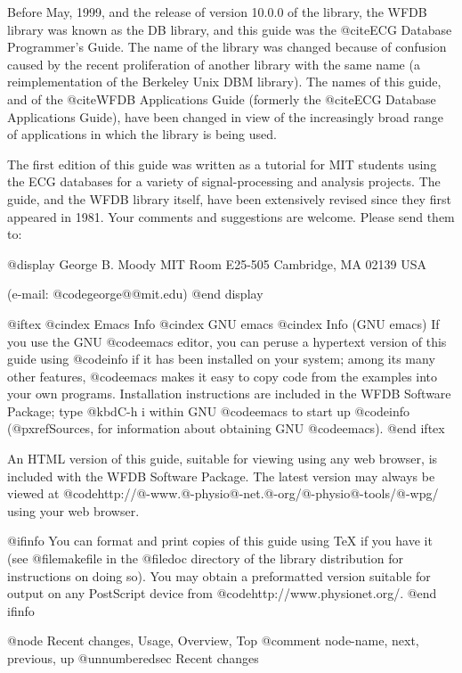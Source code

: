 Before May, 1999, and the release of version 10.0.0 of the library, the
WFDB library was known as the DB library, and this guide was the @cite{ECG
Database Programmer's Guide}.  The name of the library was changed because
of confusion caused by the recent proliferation of another library with
the same name (a reimplementation of the Berkeley Unix DBM library).
The names of this guide, and of the @cite{WFDB Applications Guide} (formerly
the @cite{ECG Database Applications Guide}), have been changed in view of
the increasingly broad range of applications in which the library is being
used.

The first edition of this guide was written as a tutorial for MIT
students using the ECG databases for a variety of signal-processing and
analysis projects.  The guide, and the WFDB library itself, have been
extensively revised since they first appeared in 1981.  Your comments
and suggestions are welcome.  Please send them to:

@display
George B. Moody
MIT Room E25-505
Cambridge, MA 02139
USA

(e-mail: @code{george@@mit.edu})
@end display

@iftex
@cindex Emacs Info
@cindex GNU emacs
@cindex Info (GNU emacs)
If you use the GNU @code{emacs} editor, you can peruse a hypertext
version of this guide using @code{info} if it has been installed on your
system; among its many other features, @code{emacs} makes it easy to
copy code from the examples into your own programs.  Installation
instructions are included in the WFDB Software Package; type @kbd{C-h i}
within GNU @code{emacs} to start up @code{info} (@pxref{Sources}, for
information about obtaining GNU @code{emacs}).
@end iftex

An HTML version of this guide, suitable for viewing using any web browser,
is included with the WFDB Software Package.  The latest version may always be
viewed at @code{http://@-www.@-physio@-net.@-org/@-physio@-tools/@-wpg/} using your web
browser.

@ifinfo
You can format and print copies of this guide using TeX if you have it (see
@file{makefile} in the @file{doc} directory of the library distribution for
instructions on doing so).  You may obtain a preformatted version suitable for
output on any PostScript device from @code{http://www.physionet.org/}.
@end ifinfo

@node     Recent changes, Usage, Overview, Top
@comment  node-name,  next,  previous,  up
@unnumberedsec Recent changes

